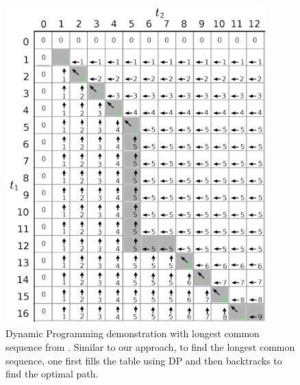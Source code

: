 \begin{figure}
\centering
\includegraphics[width=0.9\textwidth]{Figures/longest_common_sequence.png}
\caption[Demonstration on Longest Common Sequence]{
Dynamic Programming demonstration with longest common sequence from \cite{Xie2017DetectingRI}. 
Similar to our approach, to find the longest common sequence, one first fills the table using \ac{DP} and
 then backtracks to find the optimal path. 
}
\label{fig:lcs_dp}
\end{figure}




